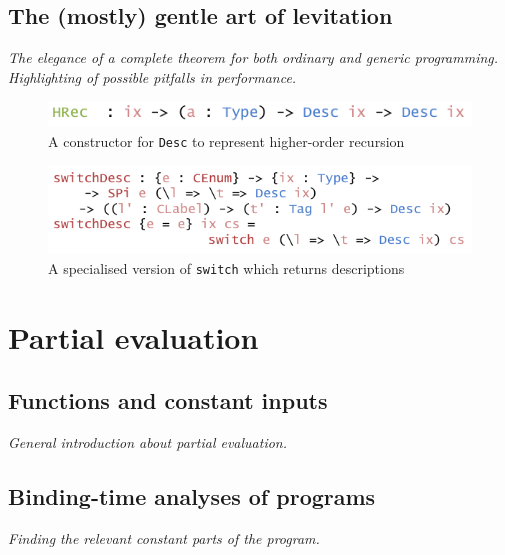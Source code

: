 \documentclass{ituthesis}
\newcommand{\tttype}[1]{\textcolor{type-color}{\texttt{#1}}}
\newcommand{\ttdec}[1]{\textcolor{declared-var-color}{\texttt{#1}}}
\begin{document}
\section{The (mostly) gentle art of levitation}
\label{sec:TheMostlyGentleArtofLevitation}
\textit{The elegance of a complete theorem for both ordinary and generic programming. Highlighting of possible pitfalls in performance.}

\begin{figure}
\begin{center}
    \includegraphics[scale=0.5]{Figures/ADescriptionForDatatypesExtended.png}
\end{center}
\caption{A constructor for \tttype{Desc} to represent higher-order recursion}
\label{fig:deschrec}
\end{figure}

\begin{figure}
\begin{center}
    \includegraphics[scale=0.5]{Figures/AConstructiveChoiceDesc.png}
\end{center}
\caption{A specialised version of \ttdec{switch} which returns descriptions}
\label{fig:switchdesc}
\end{figure}



\chapter{Partial evaluation}
\label{cha:PartialEvaluation}

\section{Functions and constant inputs}
\label{sec:FunctionsandConstantInputs}
\textit{General introduction about partial evaluation.}

\section{Binding-time analyses of programs}
\label{sec:Binding-timeAnalysisofPrograms}
\textit{Finding the relevant constant parts of the program.}
\end{document}
